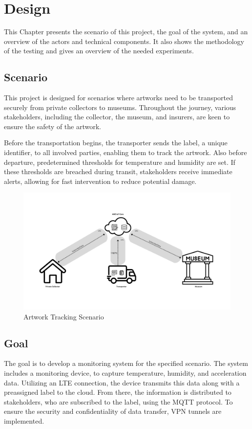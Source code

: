 \chapter{Design}
This Chapter presents the scenario of this project, the goal of the system, and an overview of the actors and technical components. It also shows the methodology of the testing and gives an overview of the needed experiments.

\section{Scenario}
This project is designed for scenarios where artworks need to be transported securely from private collectors to museums. Throughout the journey, various stakeholders, including the collector, the museum, and insurers, are keen to ensure the safety of the artwork.
    
Before the transportation begins, the transporter sends the label, a unique identifier, to all involved parties, enabling them to track the artwork. Also before departure, predetermined thresholds for temperature and humidity are set. If these thresholds are breached during transit, stakeholders receive immediate alerts, allowing for fast intervention to reduce potential damage.

\begin{figure}[H]
    \centering
    \includegraphics[width=\linewidth]{Scenario.png}
    \caption{Artwork Tracking Scenario}
    \label{fig:Artwork Tracking Scenario}
\end{figure}


\section{Goal}
The goal is to develop a monitoring system for the specified scenario.
The system includes a monitoring device, to capture temperature, humidity, and acceleration data. Utilizing an LTE connection, the device transmits this data along with a preassigned label to the cloud.
From there, the information is distributed to stakeholders, who are subscribed to the label, using the MQTT protocol.
To ensure the security and confidentiality of data transfer, VPN tunnels are implemented.


